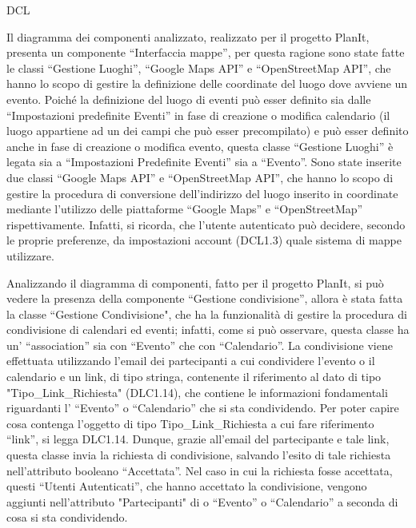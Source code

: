 \begin{listaPersonale}{DCL}
\begin{listaPersonale2}[DCL]{}
        Il diagramma dei componenti analizzato, realizzato per il progetto PlanIt, presenta un componente “Interfaccia mappe”, per questa ragione sono state fatte le classi “Gestione Luoghi”, “Google Maps API” e “OpenStreetMap API”, che hanno lo scopo di gestire la definizione delle coordinate del luogo dove avviene un evento. Poiché la definizione del luogo di eventi può esser definito sia dalle “Impostazioni predefinite Eventi” in fase di creazione o modifica calendario (il luogo appartiene ad un dei campi che può esser precompilato) e può esser definito anche in fase di creazione o modifica evento, questa classe “Gestione Luoghi” è legata sia a “Impostazioni Predefinite Eventi” sia a “Evento”.
        Sono state inserite due classi “Google Maps API” e “OpenStreetMap API”, che hanno lo scopo di gestire la procedura di conversione dell'indirizzo del luogo inserito in coordinate mediante l'utilizzo delle piattaforme “Google Maps” e “OpenStreetMap” rispettivamente. Infatti, si ricorda, che l'utente autenticato può decidere, secondo le proprie preferenze, da impostazioni account (DCL1.3) quale sistema di mappe utilizzare.



        Analizzando il diagramma di componenti, fatto per il progetto PlanIt, si può vedere la presenza della componente “Gestione condivisione”, allora è stata fatta la classe “Gestione Condivisione", che ha la funzionalità di gestire la procedura di condivisione di calendari ed eventi; infatti, come si può osservare, questa classe ha un’ “association” sia con “Evento” che con “Calendario”.  La condivisione viene effettuata utilizzando l’email dei partecipanti a cui condividere l’evento o il calendario e un link, di tipo stringa, contenente il riferimento al dato di tipo "Tipo\_Link\_Richiesta" (DLC1.14), che contiene le informazioni fondamentali riguardanti l’ “Evento” o “Calendario” che si sta condividendo. Per poter capire cosa contenga l’oggetto di tipo Tipo\_Link\_Richiesta a cui fare riferimento “link”, si legga DLC1.14. Dunque, grazie all’email del partecipante e tale link, questa classe invia la richiesta di condivisione, salvando l’esito di tale richiesta nell’attributo booleano “Accettata”. Nel caso in cui la richiesta fosse accettata, questi “Utenti Autenticati”, che hanno accettato la condivisione, vengono aggiunti nell’attributo "Partecipanti" di o “Evento” o “Calendario” a seconda di cosa si sta condividendo.

    \end{listaPersonale2}



\end{listaPersonale}
